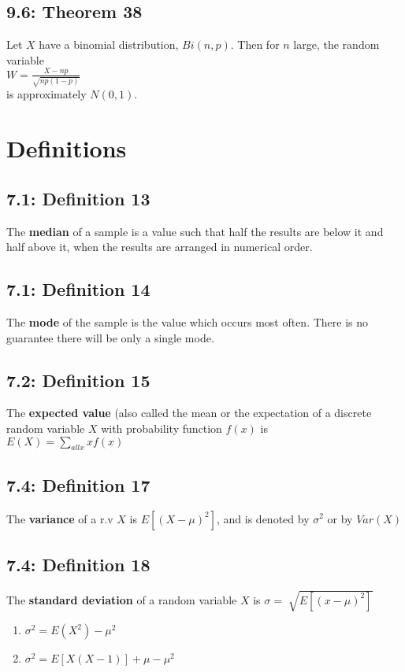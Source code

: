 \documentclass[11pt]{article}
\begin{document}
	\subsection*{9.6: Theorem 38}
		Let $X$ have a binomial distribution, $Bi(n,p)$. Then for $n$ large, the random variable\\
		$W=\frac{X-np}{\sqrt{np(1-p)}}$\\
		is approximately $N(0,1)$.
		
	
\section*{Definitions}
	\subsection*{7.1: Definition 13}
		The {\bf median} of a sample is a value such that half the results are below it and half above it, when the results are arranged in numerical order.
	\subsection*{7.1: Definition 14}
	 The {\bf mode} of the sample is the value which occurs most often. There is no guarantee there will be only a single mode.
	 \subsection*{7.2: Definition 15}
	 	The {\bf expected value} (also called the mean or the expectation of a discrete random variable $X$ with probability function $f(x)$ is \\
	 	$E(X)=\sum_{all x}xf(x)$
	 \subsection*{7.4: Definition 17}
	 	The {\bf variance} of a r.v $X$ is $E[(X-\mu)^2]$, and is denoted by $\sigma^2$ or by  $Var(X)$
	 	
	 \subsection*{7.4: Definition 18}
	 	The {\bf standard deviation } of a random variable $X$ is $\sigma = \sqrt[]{E[(x-\mu)^2]}$
	 	\begin{enumerate}
	 		\item $\sigma^2=E(X^2)-\mu^2$
	 		\item $\sigma^2=E[X(X-1)]+\mu-\mu^2$
	 	\end{enumerate}
	 	
\end{document}
